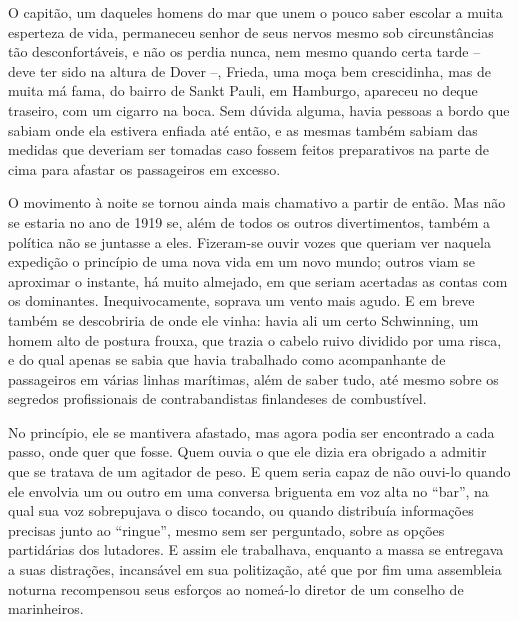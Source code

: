 O capitão, um daqueles homens do mar que unem o pouco saber escolar a
muita esperteza de vida, permaneceu senhor de seus nervos mesmo sob
circunstâncias tão desconfortáveis, e não os perdia nunca, nem mesmo
quando certa tarde -- deve ter sido na altura de Dover --, Frieda, uma
moça bem crescidinha, mas de muita má fama, do bairro de Sankt Pauli, em
Hamburgo, apareceu no deque traseiro, com um cigarro na boca. Sem dúvida
alguma, havia pessoas a bordo que sabiam onde ela estivera enfiada até
então, e as mesmas também sabiam das medidas que deveriam ser tomadas
caso fossem feitos preparativos na parte de cima para afastar os
passageiros em excesso.

O movimento à noite se tornou ainda mais chamativo a partir de então.
Mas não se estaria no ano de 1919 se, além de todos os outros
divertimentos, também a política não se juntasse a eles. Fizeram-se
ouvir vozes que queriam ver naquela expedição o princípio de uma nova
vida em um novo mundo; outros viam se aproximar o instante, há muito
almejado, em que seriam acertadas as contas com os dominantes.
Inequivocamente, soprava um vento mais agudo. E em breve também se
descobriria de onde ele vinha: havia ali um certo Schwinning, um homem
alto de postura frouxa, que trazia o cabelo ruivo dividido por uma
risca, e do qual apenas se sabia que havia trabalhado como acompanhante
de passageiros em várias linhas marítimas, além de saber tudo, até mesmo
sobre os segredos profissionais de contrabandistas finlandeses de
combustível.

No princípio, ele se mantivera afastado, mas agora podia ser encontrado
a cada passo, onde quer que fosse. Quem ouvia o que ele dizia era
obrigado a admitir que se tratava de um agitador de peso. E quem seria
capaz de não ouvi-lo quando ele envolvia um ou outro em uma conversa
briguenta em voz alta no ``bar'', na qual sua voz sobrepujava o disco
tocando, ou quando distribuía informações precisas junto ao ``ringue'',
mesmo sem ser perguntado, sobre as opções partidárias dos lutadores. E
assim ele trabalhava, enquanto a massa se entregava a suas distrações,
incansável em sua politização, até que por fim uma assembleia noturna
recompensou seus esforços ao nomeá-lo diretor de um conselho de
marinheiros.

